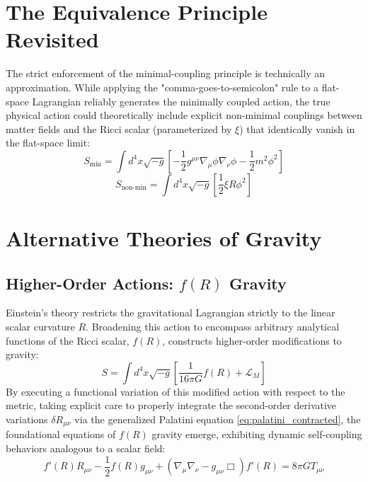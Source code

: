 \documentclass[11pt, a4paper]{report}
\begin{document}
\section{The Equivalence Principle Revisited}
The strict enforcement of the minimal-coupling principle is technically an approximation. While applying the "comma-goes-to-semicolon" rule to a flat-space Lagrangian reliably generates the minimally coupled action, the true physical action could theoretically include explicit non-minimal couplings between matter fields and the Ricci scalar (parameterized by $\xi$) that identically vanish in the flat-space limit:
\begin{equation}
\label{eq:minimal_scalar}
S_{\text{min}} = \int d^{4}x \sqrt{-g} \left[ -\frac{1}{2} g^{\mu\nu} \nabla_{\mu}\phi \nabla_{\nu}\phi - \frac{1}{2}m^{2}\phi^{2} \right]
\end{equation}
\begin{equation}
\label{eq:nonminimal_scalar}
S_{\text{non-min}} = \int d^{4}x \sqrt{-g} \left[ \frac{1}{2} \xi R \phi^{2} \right]
\end{equation}

\section{Alternative Theories of Gravity}
\subsection{Higher-Order Actions: $f(R)$ Gravity}
Einstein's theory restricts the gravitational Lagrangian strictly to the linear scalar curvature $R$. Broadening this action to encompass arbitrary analytical functions of the Ricci scalar, $f(R)$, constructs higher-order modifications to gravity:
\begin{equation}
\label{eq:fR_action}
S = \int d^{4}x \sqrt{-g} \left[ \frac{1}{16\pi G} f(R) + \mathcal{L}_{M} \right]
\end{equation}
By executing a functional variation of this modified action with respect to the metric, taking explicit care to properly integrate the second-order derivative variations $\delta R_{\mu\nu}$ via the generalized Palatini equation \eqref{eq:palatini_contracted}, the foundational equations of $f(R)$ gravity emerge, exhibiting dynamic self-coupling behaviors analogous to a scalar field:
\begin{equation}
\label{eq:fR_field_equation}
f'(R)R_{\mu\nu} - \frac{1}{2}f(R)g_{\mu\nu} + \left( \nabla_{\mu}\nabla_{\nu} - g_{\mu\nu}\Box \right) f'(R) = 8\pi G T_{\mu\nu}
\end{equation}
\end{document}
